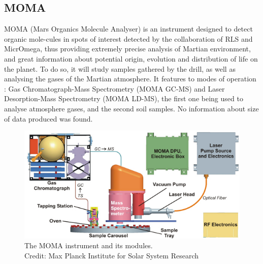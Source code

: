 \documentclass[12pt,a4paper]{article}
\begin{document}
\subsection{MOMA}
MOMA (Mars Organics Molecule Analyser) is an instrument designed to detect organic mole-cules in spots of interest detected by the collaboration of RLS and MicrOmega, thus providing extremely precise analysis of Martian environment, and great information about potential origin, evolution and distribution of life on the planet. To do so, it will study samples gathered by the drill, as well as analysing the gases of the Martian atmosphere. It features to modes of operation : Gas Chromatograph-Mass Spectrometry (MOMA GC-MS) and Laser Desorption-Mass Spectrometry (MOMA LD-MS), the first one being used to analyse atmosphere gases, and the second soil samples. No information about size of data produced was found.

\begin{figure}[h]
\centering
\includegraphics[scale=.7]{pictures/MOMA.jpg}
\caption{The MOMA instrument and its modules.\\Credit: Max Planck Institute for Solar System Research}
\end{figure}

\pagebreak
\end{document}
